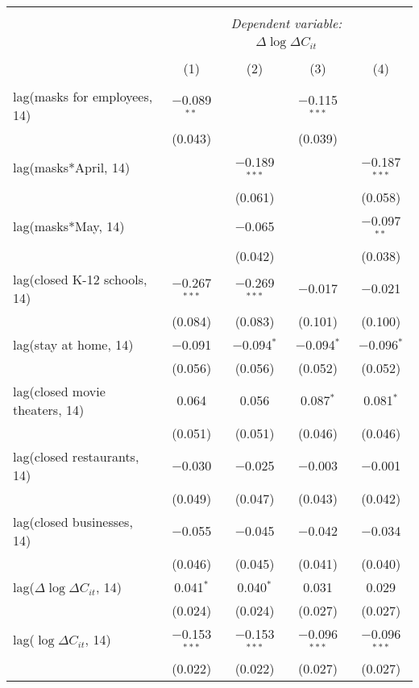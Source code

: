 \begin{tabular}{@{\extracolsep{1pt}}lcccc} 
\\[-1.8ex]\hline 
\hline \\[-1.8ex] 
 & \multicolumn{4}{c}{\textit{Dependent variable:}} \\ 
\cline{2-5} 
 & \multicolumn{4}{c}{$\Delta \log \Delta C_{it}$} \\ 
\\[-1.8ex] & (1) & (2) & (3) & (4)\\ 
\hline \\[-1.8ex] 
 lag(masks for employees, 14) & $-$0.089$^{**}$ &  & $-$0.115$^{***}$ &  \\ 
  & (0.043) &  & (0.039) &  \\ 
  lag(masks*April, 14) &  & $-$0.189$^{***}$ &  & $-$0.187$^{***}$ \\ 
  &  & (0.061) &  & (0.058) \\ 
  lag(masks*May, 14) &  & $-$0.065 &  & $-$0.097$^{**}$ \\ 
  &  & (0.042) &  & (0.038) \\ 
  lag(closed K-12 schools, 14) & $-$0.267$^{***}$ & $-$0.269$^{***}$ & $-$0.017 & $-$0.021 \\ 
  & (0.084) & (0.083) & (0.101) & (0.100) \\ 
  lag(stay at home, 14) & $-$0.091 & $-$0.094$^{*}$ & $-$0.094$^{*}$ & $-$0.096$^{*}$ \\ 
  & (0.056) & (0.056) & (0.052) & (0.052) \\ 
  lag(closed movie theaters, 14) & 0.064 & 0.056 & 0.087$^{*}$ & 0.081$^{*}$ \\ 
  & (0.051) & (0.051) & (0.046) & (0.046) \\ 
  lag(closed restaurants, 14) & $-$0.030 & $-$0.025 & $-$0.003 & $-$0.001 \\ 
  & (0.049) & (0.047) & (0.043) & (0.042) \\ 
  lag(closed businesses, 14) & $-$0.055 & $-$0.045 & $-$0.042 & $-$0.034 \\ 
  & (0.046) & (0.045) & (0.041) & (0.040) \\ 
  lag($\Delta \log \Delta C_{it}$, 14) & 0.041$^{*}$ & 0.040$^{*}$ & 0.031 & 0.029 \\ 
  & (0.024) & (0.024) & (0.027) & (0.027) \\ 
  lag($\log \Delta C_{it}$, 14) & $-$0.153$^{***}$ & $-$0.153$^{***}$ & $-$0.096$^{***}$ & $-$0.096$^{***}$ \\ 
  & (0.022) & (0.022) & (0.027) & (0.027) \\ 

\end{tabular}
